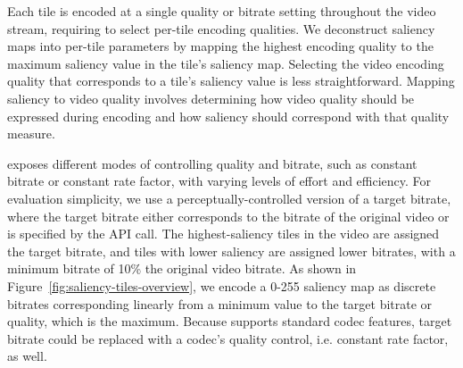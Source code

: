 Each \hevc tile is encoded at a single quality or bitrate setting throughout the video stream, requiring \nameCompress to select per-tile encoding qualities.
We deconstruct saliency maps into per-tile parameters by mapping the highest encoding quality to the maximum saliency value in the tile's saliency map.
Selecting the video encoding quality that corresponds to a tile's saliency value is less straightforward.
Mapping saliency to video quality involves determining how video quality should be expressed during encoding and how saliency should correspond with that quality measure.

\hevc exposes different modes of controlling quality and bitrate, such as constant bitrate or constant rate factor, with varying levels of effort and efficiency.
For evaluation simplicity, we use a perceptually-controlled version of a target bitrate, where the target bitrate either corresponds to the bitrate of the original video or is specified by the API call.
The highest-saliency tiles in the video are assigned the target bitrate, and tiles with lower saliency are assigned lower bitrates, with a minimum bitrate of 10\% the original video bitrate.
As shown in Figure~\ref{fig:saliency-tiles-overview}, we encode a 0-255 saliency map as discrete bitrates corresponding linearly from a minimum value to the target bitrate or quality, which is the maximum.
Because \name supports standard codec features, target bitrate could be replaced with a codec's quality control, i.e. constant rate factor, as well.

